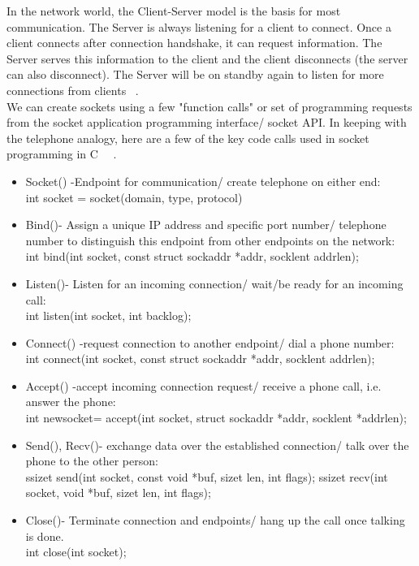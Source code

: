 In the network world, the Client-Server model is the basis for most communication. The Server is always listening for a client to connect. Once a client connects after connection handshake, it can request information. The Server serves this information to the client and the client disconnects (the server can also disconnect). The Server will be on standby again to listen for more connections from clients ~\cite{35}. \\

We can create sockets using a few "function calls" or set of programming requests from the socket application programming interface/ socket API. In keeping with the telephone analogy, here are a few of the key code calls used in socket programming in C ~\cite{35}~\cite{36}.
   \begin{itemize}
   \item Socket() -Endpoint for communication/ create telephone on either end:\\
   int socket = socket(domain, type, protocol)
   \item Bind()- Assign a unique IP address and specific port number/ telephone number to distinguish this endpoint from other endpoints on the network:\\
   int bind(int socket, const struct sockaddr *addr, 
                          socklen\textunderscore t addrlen);
   \item Listen()- Listen for an incoming connection/ wait/be ready for an incoming call:\\
   int listen(int socket, int backlog);
   \item Connect() -request connection to another endpoint/ dial a phone number:\\
   int connect(int socket, const struct sockaddr *addr,  
                             socklen\textunderscore t addrlen);
   \item Accept() -accept incoming connection request/ receive a phone call, i.e. answer the phone:\\
   int new\textunderscore socket= accept(int socket, struct sockaddr *addr, socklen\textunderscore t *addrlen);
   \item Send(), Recv()- exchange data over the established connection/ talk over the phone to the other person: \\
   ssize\textunderscore t send(int socket, const void *buf, size\textunderscore t len, int flags);
   ssize\textunderscore t recv(int socket, void *buf, size\textunderscore t len, int flags);
   \item Close()- Terminate connection and endpoints/ hang up the call once talking is done. \\
   int close(int socket);
   \end{itemize} 
   
